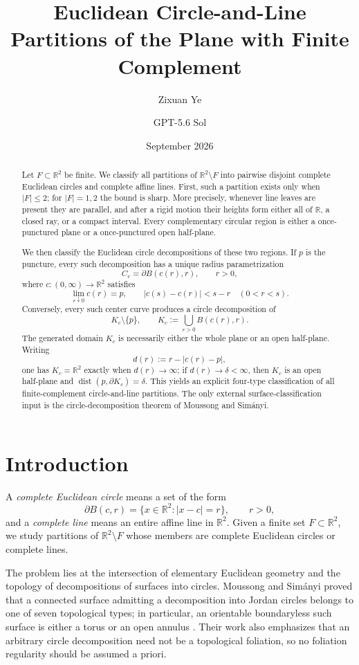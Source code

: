 \documentclass[11pt]{article}
\title{\textbf{Euclidean Circle-and-Line Partitions of the Plane with Finite Complement}}
\author{Zixuan Ye \and GPT-5.6 Sol}
\date{September 2026}
\newcommand{\R}{\mathbb{R}}
\DeclareMathOperator{\dist}{dist}
\begin{document}
\maketitle

\begin{abstract}
Let $F\subset\R^2$ be finite. We classify all partitions of $\R^2\setminus F$ into pairwise disjoint complete Euclidean circles and complete affine lines. First, such a partition exists only when $|F|\le 2$; for $|F|=1,2$ the bound is sharp. More precisely, whenever line leaves are present they are parallel, and after a rigid motion their heights form either all of $\R$, a closed ray, or a compact interval. Every complementary circular region is either a once-punctured plane or a once-punctured open half-plane.

We then classify the Euclidean circle decompositions of these two regions. If $p$ is the puncture, every such decomposition has a unique radius parametrization
\[
C_r=\partial B(c(r),r),\qquad r>0,
\]
where $c:(0,\infty)\to\R^2$ satisfies
\[
\lim_{r\downarrow0}c(r)=p,
\qquad
|c(s)-c(r)|<s-r\quad(0<r<s).
\]
Conversely, every such center curve produces a circle decomposition of
\[
K_c\setminus\{p\},
\qquad
K_c:=\bigcup_{r>0}B(c(r),r).
\]
The generated domain $K_c$ is necessarily either the whole plane or an open half-plane. Writing
\[
d(r):=r-|c(r)-p|,
\]
one has $K_c=\R^2$ exactly when $d(r)\to\infty$; if $d(r)\to\delta<\infty$, then $K_c$ is an open half-plane and $\dist(p,\partial K_c)=\delta$. This yields an explicit four-type classification of all finite-complement circle-and-line partitions. The only external surface-classification input is the circle-decomposition theorem of Moussong and Sim\'anyi.
\end{abstract}

\section{Introduction}

A \emph{complete Euclidean circle} means a set of the form
\[
\partial B(c,r)=\{x\in\R^2:|x-c|=r\},\qquad r>0,
\]
and a \emph{complete line} means an entire affine line in $\R^2$. Given a finite set $F\subset\R^2$, we study partitions of $\R^2\setminus F$ whose members are complete Euclidean circles or complete lines.

The problem lies at the intersection of elementary Euclidean geometry and the topology of decompositions of surfaces into circles. Moussong and Sim\'anyi proved that a connected surface admitting a decomposition into Jordan circles belongs to one of seven topological types; in particular, an orientable boundaryless such surface is either a torus or an open annulus \cite{MoussongSimanyi}. Their work also emphasizes that an arbitrary circle decomposition need not be a topological foliation, so no foliation regularity should be assumed a priori.
\end{document}
